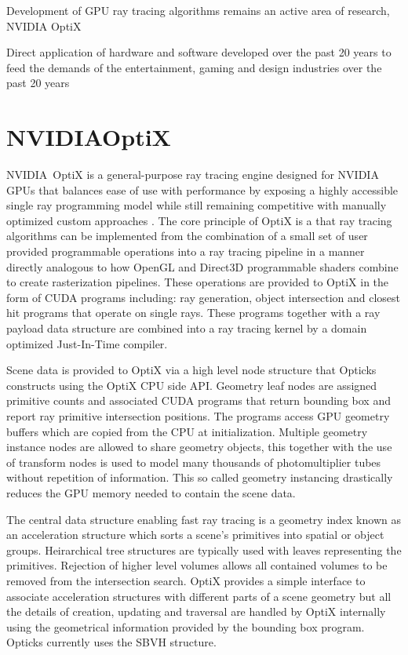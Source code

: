 \documentclass[a4paper]{jpconf}
\begin{document}
Development of GPU ray tracing algorithms remains an active area of research, NVIDIA OptiX

 
Direct application of hardware and software developed over the past 20 years 
to feed the demands
of the entertainment, gaming and design industries over the past 20 years 


  


\section{NVIDIA\textregistered OptiX\texttrademark}

NVIDIA\textregistered\ OptiX\texttrademark \cite{optixPaper} \cite{optixSite} 
is a general-purpose ray tracing engine designed for NVIDIA GPUs
that balances ease of use with performance by exposing a highly accessible 
single ray programming model while still remaining competitive with manually 
optimized custom approaches \cite{optixPaper} \cite{understanding}.  
The core principle of OptiX is a that ray tracing algorithms can be implemented 
from the combination of a small set of user provided programmable operations
into a ray tracing pipeline in a manner directly analogous to how OpenGL 
and Direct3D programmable shaders combine to create rasterization pipelines.
These operations are provided to OptiX in the form of CUDA programs \cite{cudaPaper} \cite{cudaURL} 
including: ray generation, object intersection and closest hit programs that operate on 
single rays. These programs together with a ray payload data structure are combined 
into a ray tracing kernel by a domain optimized Just-In-Time compiler.


Scene data is provided to OptiX via a high level node structure that 
Opticks constructs using the OptiX CPU side API. 
Geometry leaf nodes are assigned primitive counts 
and associated CUDA programs that return bounding box and 
report ray primitive intersection positions. 
The programs access GPU geometry buffers which are copied from the CPU at initialization.
Multiple geometry instance nodes are allowed to share geometry objects, this 
together with the use of transform nodes is used to model many thousands of  
photomultiplier tubes without repetition of information. This so called geometry 
instancing drastically reduces the GPU memory needed to contain the scene data.

The central data structure enabling fast ray tracing is a geometry index
known as an acceleration structure which sorts a scene’s primitives 
into spatial or object groups. 
Heirarchical tree structures are typically used
with leaves representing the primitives.  Rejection of higher level
volumes allows all contained volumes to be removed from the intersection
search. OptiX provides a simple interface to associate acceleration structures 
with different parts of a scene geometry but all the details of creation, updating 
and traversal are handled by OptiX internally using the geometrical information provided by the 
bounding box program. Opticks currently uses the SBVH structure\cite{SBVH}.
\end{document}
